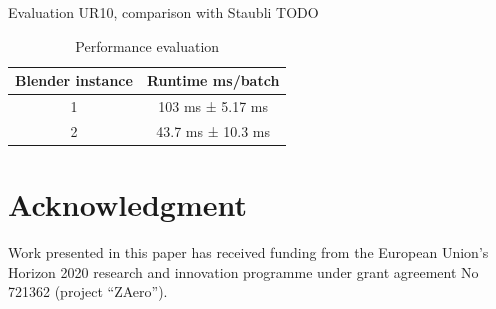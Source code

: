 \documentclass[conference]{IEEEtran}
\begin{document}
Evaluation UR10, comparison with Staubli
TODO

\begin{table}[htbp]
\caption{Performance evaluation}
\begin{center}
\begin{tabular}{|c|c|}
\hline
\textbf{Blender instance} & \textbf{Runtime ms/batch} \\
\hline
1 & 103 ms ± 5.17 ms \\
\hline
2 & 43.7 ms ± 10.3 ms \\
\hline
\end{tabular}
\label{tab1}
\end{center}
\end{table}

\section*{Acknowledgment}

Work presented in this paper has received funding from the European Union’s Horizon 2020 research and innovation programme under grant agreement No 721362 (project “ZAero”).

\small





\end{document}

